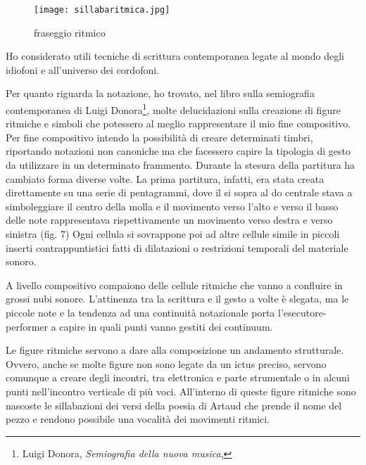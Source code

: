 
\begin{figure}[htbp]
\begin{center}
\texttt{[image: sillabaritmica.jpg]}
\caption{fraseggio ritmico}
\label{default}
\end{center}
\end{figure}

Ho considerato utili tecniche di scrittura contemporanea legate al mondo degli idiofoni e all'universo dei cordofoni.

Per quanto riguarda la notazione, ho trovato, nel libro sulla semiografia contemporanea di Luigi Donora\footnote{Luigi Donora, \textit{Semiografia della nuova musica}, }, molte delucidazioni sulla creazione di figure ritmiche e simboli che potessero al meglio rappresentare il mio fine compositivo. Per fine compositivo intendo la possibilità di creare determinati timbri, riportando notazioni non canoniche ma che facessero capire la tipologia di gesto da utilizzare in un determinato frammento. Durante la stesura della partitura ha cambiato forma diverse volte. La prima partitura, infatti, era stata creata direttamente su una serie di pentagrammi, dove il si sopra al do centrale stava a simboleggiare il centro della molla e il movimento verso l'alto e verso il basso delle note rappresentava rispettivamente un movimento verso destra e verso sinistra (fig. 7)
Ogni cellula si sovrappone poi ad altre cellule simile in piccoli inserti contrappuntistici fatti di dilatazioni o restrizioni temporali del materiale sonoro.

A livello compositivo compaiono delle cellule ritmiche che vanno a confluire in grossi nubi sonore. L'attinenza tra la scrittura e il gesto a volte è slegata, ma le piccole note e la tendenza ad una continuità notazionale porta l'esecutore-performer a capire in quali punti vanno gestiti dei continuum.

Le figure ritmiche servono a dare alla composizione un andamento strutturale. Ovvero, anche se molte figure non sono legate da un ictus preciso, servono comunque a creare degli incontri, tra elettronica e parte strumentale o in alcuni punti nell'incontro verticale di più voci. All'interno di queste figure ritmiche sono nascoste le sillabazioni dei versi della poesia di Artaud che prende il nome del pezzo e rendono possibile una vocalità dei movimenti ritmici.

